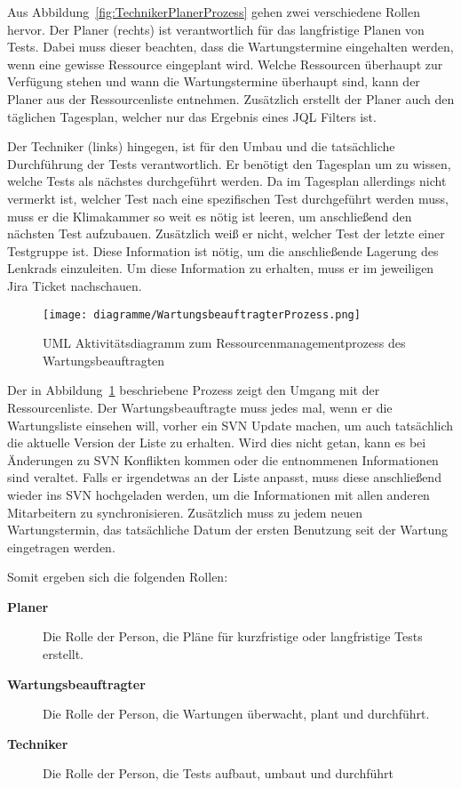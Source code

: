 Aus Abbildung~\ref{fig:TechnikerPlanerProzess} gehen zwei verschiedene Rollen hervor. Der
Planer (rechts) ist verantwortlich für das langfristige Planen von Tests. Dabei muss
dieser beachten, dass die Wartungstermine eingehalten werden, wenn
eine gewisse Ressource eingeplant wird. Welche Ressourcen überhaupt zur
Verfügung stehen und wann die Wartungstermine überhaupt sind, kann der Planer aus
der Ressourcenliste entnehmen. Zusätzlich erstellt der Planer auch den täglichen 
Tagesplan, welcher nur das Ergebnis eines \gls{JQL} Filters ist. 

Der Techniker (links) hingegen, ist für den Umbau und die tatsächliche Durchführung der 
Tests verantwortlich. Er benötigt den Tagesplan um zu wissen, welche Tests als 
nächstes durchgeführt werden. Da im Tagesplan allerdings nicht vermerkt ist, 
welcher Test nach eine spezifischen Test durchgeführt werden muss, muss er die 
Klimakammer so weit es nötig ist leeren, um anschließend den nächsten Test 
aufzubauen. Zusätzlich weiß er nicht, welcher Test der letzte einer Testgruppe ist.
Diese Information ist nötig, um die anschließende Lagerung des Lenkrads einzuleiten.
Um diese Information zu erhalten, muss er im jeweiligen Jira Ticket nachschauen. \\

\begin{figure}[H]
    \texttt{[image: diagramme/WartungsbeauftragterProzess.png]}
    \caption{UML Aktivitätsdiagramm zum Ressourcenmanagementprozess des Wartungsbeauftragten}\label{fig:WarterProzess}
\end{figure}

Der in Abbildung~\ref{fig:WarterProzess} beschriebene Prozess zeigt den Umgang mit der 
Ressourcenliste. Der Wartungsbeauftragte muss jedes mal, wenn er die Wartungsliste
einsehen will, vorher ein \gls{SVN} Update machen, um auch tatsächlich die aktuelle
Version der Liste zu erhalten. Wird dies nicht getan, kann es bei Änderungen 
zu \gls{SVN} Konflikten kommen oder die entnommenen Informationen sind veraltet.
Falls er irgendetwas an der Liste anpasst, muss diese anschließend wieder ins 
\gls{SVN} hochgeladen werden, um die Informationen mit allen anderen Mitarbeitern
zu synchronisieren. Zusätzlich muss zu jedem neuen Wartungstermin, das tatsächliche
Datum der ersten Benutzung seit der Wartung eingetragen werden.

Somit ergeben sich die folgenden Rollen:

\begin{description}
    \item[\textbf{Planer}] Die Rolle der Person, die Pläne für kurzfristige oder
    langfristige Tests erstellt.

    \item[\textbf{Wartungsbeauftragter}] Die Rolle der Person, die Wartungen 
    überwacht, plant und durchführt. 

    \item[\textbf{Techniker}] Die Rolle der Person, die Tests aufbaut, umbaut und
    durchführt
\end{description}

